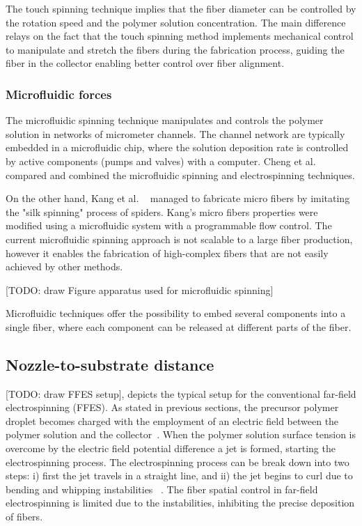 \documentclass[5p,,preprint,12pt,twocolumn]{elsarticle}
\begin{document}
The touch spinning technique implies that the fiber diameter can be controlled by the rotation speed and the polymer solution concentration. The main difference relays on the fact that the touch spinning method implements mechanical control to manipulate and stretch the fibers during the fabrication process, guiding the fiber in the collector enabling better control over fiber alignment.\unskip~\cite{527120:14091959}



\subsubsection{Microfluidic forces}The microfluidic spinning technique manipulates and controls the polymer solution in networks of micrometer channels. The channel network are typically embedded in a microfluidic chip, where the solution deposition rate is controlled by active components (pumps and valves) with a computer. Cheng et al. \unskip~\cite{527120:13656236} compared and combined the microfluidic spinning and electrospinning techniques. 

On the other hand, Kang et al. \unskip~\cite{527120:13656548} managed to fabricate micro fibers by imitating the "silk spinning" process of spiders. Kang's micro fibers properties were modified using a microfluidic system with a programmable flow control. The current microfluidic spinning approach is not scalable to a large fiber production, however it enables the fabrication of high-complex fibers that are not easily achieved by other methods.

[TODO: draw Figure apparatus used for microfluidic spinning]

Microfluidic techniques offer the possibility to embed several components into a single fiber, where each component can be released at different parts of the fiber. 



\subsection{Nozzle-to-substrate distance}[TODO: draw FFES setup], depicts the typical setup for the conventional far-field electrospinning (FFES). As stated in previous sections, the precursor polymer droplet becomes charged with the employment of an electric field between the polymer solution and the collector\unskip~\cite{527120:14135125}. When the polymer solution surface tension is overcome by the electric field potential difference a jet is formed, starting the electrospinning process. The electrospinning process can be break down into two steps: i) first the jet travels in a straight line, and ii) the jet begins to curl due to bending and whipping instabilities \unskip~\cite{527120:13444381,527120:14135543}. The fiber spatial control in far-field electrospinning is limited due to the instabilities, inhibiting the precise deposition of fibers.
\end{document}
